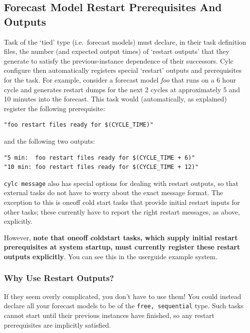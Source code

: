 \documentclass[11pt,a4paper]{article}
\begin{document}
\subsection{Forecast Model Restart Prerequisites And Outputs}

Task of the `tied' type (i.e.\ forecast models) must declare, in their
task definition files, the number (and expected output times) of
`restart outputs' that they generate to satisfy the previous-instance
dependence of their successors. Cylc configure then automatically
registers special `restart' outputs and prerequisites for the task.
For example, consider a forecast model {\em foo} that runs on a
6 hour cycle and generates restart dumps for the next 2 cycles at
approximately 5 and 10 minutes into the forecast. This task would  
(automatically, as explained) register the following prerequisite:

\begin{lstlisting}
"foo restart files ready for $(CYCLE_TIME)"
\end{lstlisting}

and the following two outputs:

\begin{lstlisting}
"5 min:  foo restart files ready for $(CYCLE_TIME + 6)"
"10 min: foo restart files ready for $(CYCLE_TIME + 12)"
\end{lstlisting}

\lstinline=cylc message= also has special options for dealing with 
restart outputs, so that external tasks do not have to worry about the
exact message format. The exception to this is oneoff cold start tasks
that provide initial restart inputs for other tasks; these currently 
have to report the right restart messages, as above, explicitly.

However, {\bf note that oneoff coldstart tasks, which supply initial
restart prerequisites at system startup, must currently register these
restart outputs explicitly}. You can see this in the userguide example
system.

\subsubsection{Why Use Restart Outputs?}

If they seem overly complicated, you don't have to use them! You could
instead declare all your forecast models to be of the  
\lstinline=free, sequential= type. Such tasks cannot start until their
previous instances have finished, so any restart prerequisites are
implicitly satisfied.
\end{document}
